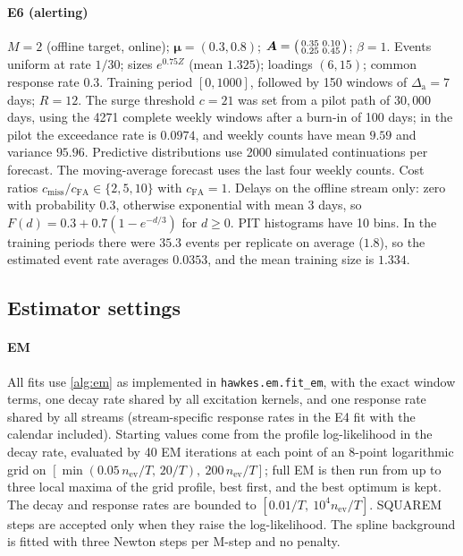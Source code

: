 \paragraph{E6 (alerting)} $M=2$ (offline target, online); $\bm\mu=(0.3,0.8)$;
$\bm{A}=\bigl(\begin{smallmatrix}0.35&0.10\\0.25&0.45\end{smallmatrix}\bigr)$; $\beta=1$.
Events uniform at rate $1/30$; sizes $e^{0.75Z}$ (mean $1.325$); loadings $(6,15)$; common
response rate $0.3$. Training period $[0,1000]$, followed by 150 windows of
$\Delta_{\mathrm a}=7$ days; $R=12$. The surge threshold $c=21$ was set from a pilot path of
$30{,}000$ days, using the 4271 complete weekly windows after a burn-in of 100 days; in the
pilot the exceedance rate is $0.0974$, and weekly counts have mean $9.59$ and variance
$95.96$. Predictive distributions use 2000 simulated continuations per forecast. The
moving-average forecast uses the last four weekly counts. Cost ratios
$c_{\mathrm{miss}}/c_{\mathrm{FA}}\in\{2,5,10\}$ with $c_{\mathrm{FA}}=1$. Delays on the
offline stream only: zero with probability $0.3$, otherwise exponential with mean 3 days,
so $F(d)=0.3+0.7(1-e^{-d/3})$ for $d\ge0$. PIT histograms have 10 bins. In the training
periods there were $35.3$ events per replicate on average ($1.8$), so the estimated event
rate averages $0.0353$, and the mean training size is $1.334$.

\subsection{Estimator settings}\label{app:sim-est}

\paragraph{EM} All fits use \cref{alg:em} as implemented in \texttt{hawkes.em.fit\_em}, with
the exact window terms, one decay rate shared by all excitation kernels, and one response
rate shared by all streams (stream-specific response rates in the E4 fit with the calendar
included). Starting values come from the profile log-likelihood in the decay rate, evaluated
by 40 EM iterations at each point of an 8-point logarithmic grid on
$[\min(0.05\,n_{\mathrm{ev}}/T,\,20/T),\ 200\,n_{\mathrm{ev}}/T]$; full EM is then run from
up to three local maxima of the grid profile, best first, and the best optimum is kept. The
decay and response rates are bounded to $[0.01/T,\ 10^4n_{\mathrm{ev}}/T]$. SQUAREM steps
are accepted only when they raise the log-likelihood. The spline background is fitted with
three Newton steps per M-step and no penalty.

